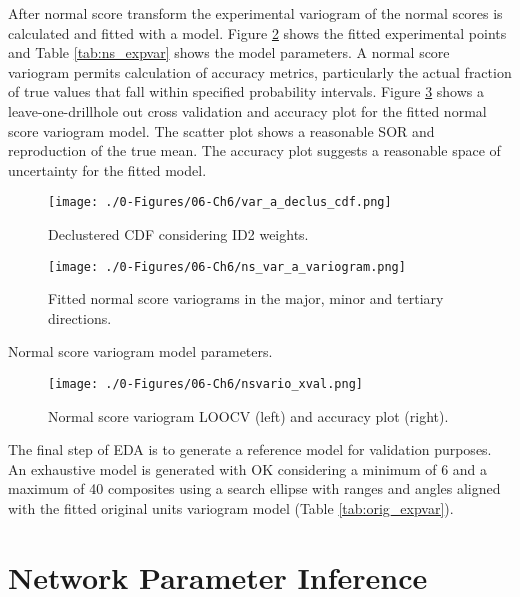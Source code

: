 After normal score transform the experimental variogram of the normal scores is calculated and fitted with a model. Figure \ref{fig:ns_expvar} shows the fitted experimental points and Table \ref{tab:ns_expvar} shows the model parameters. A normal score variogram permits calculation of accuracy metrics, particularly the actual fraction of true values that fall within specified probability intervals. Figure \ref{fig:ns_xval} shows a leave-one-drillhole out cross validation and accuracy plot for the fitted normal score variogram model. The scatter plot shows a reasonable \gls{SOR} and reproduction of the true mean. The accuracy plot suggests a reasonable space of uncertainty for the fitted model.

\begin{figure}[htb!]
    \centering
    \texttt{[image: ./0-Figures/06-Ch6/var\_a\_declus\_cdf.png]}
    \caption{ Declustered \gls{CDF} considering \gls{ID2} weights. }
    \label{fig:declus_cdf}
\end{figure}

\begin{figure}[htb!]
    \centering
    \texttt{[image: ./0-Figures/06-Ch6/ns\_var\_a\_variogram.png]}
    \caption{Fitted normal score variograms in the major, minor and tertiary directions. }
    \label{fig:ns_expvar}
\end{figure}

\begin{table}[!htb]
    \centering
    \caption{Normal score variogram model parameters.}
    \resizebox{1\width}{!}{}
    \label{tab:ns_expvar}
\end{table}

\begin{figure}[htb!]
    \centering
    \texttt{[image: ./0-Figures/06-Ch6/nsvario\_xval.png]}
    \caption{Normal score variogram \gls{LOOCV} (left) and accuracy plot (right).}
    \label{fig:ns_xval}
\end{figure}

The final step of \gls{EDA} is to generate a reference model for validation purposes. An exhaustive model is generated with \gls{OK} considering a minimum of 6 and a maximum of 40 composites using a search ellipse with ranges and angles aligned with the fitted original units variogram model (Table \ref{tab:orig_expvar}).

\FloatBarrier
\section{Network Parameter Inference}
\label{sec:param}

